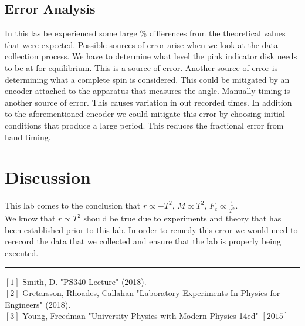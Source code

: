 \documentclass[12pt]{report}
\begin{document}
\begin{flushleft}
\begin{multicols}{2}
\subsection{Error Analysis}
In this las be experienced some large \% differences from the theoretical values that were expected. Possible sources of error arise when we look at the data collection process. We have to determine what level the pink indicator disk needs to be at for equilibrium. This is a source of error. Another source of error is determining what a complete spin is considered. This could be mitigated by an encoder attached to the apparatus that measures the angle. Manually timing is another source of error. This causes variation in out recorded times. In addition to the aforementioned encoder we could mitigate this error by choosing initial conditions that produce a large period. This reduces the fractional error from hand timing.
\section{Discussion}
This lab comes to the conclusion that $r\propto -T^2$,
$M\propto T^2$,
$F_c\propto \frac{1}{T^2}$.\\
We know that $r\propto T^2$ should be true due to experiments and theory that has been established prior to this lab. In order to remedy this error we would need to rerecord the data that we collected and ensure that the lab is properly being executed.
\end{multicols}
\begin{center}
  \noindent\rule{8cm}{0.4pt}
\end{center}
\begin{flushleft}
$[1]$ Smith, D. "PS340 Lecture" (2018).\\
$[2]$ Gretarsson, Rhoades, Callahan "Laboratory Experiments In Physics for Engineers" (2018).\\
$[3]$ Young, Freedman "University Physics with Modern Physics 14ed" $[2015]$
\end{flushleft}


\newpage

\end{flushleft}
\end{document}
